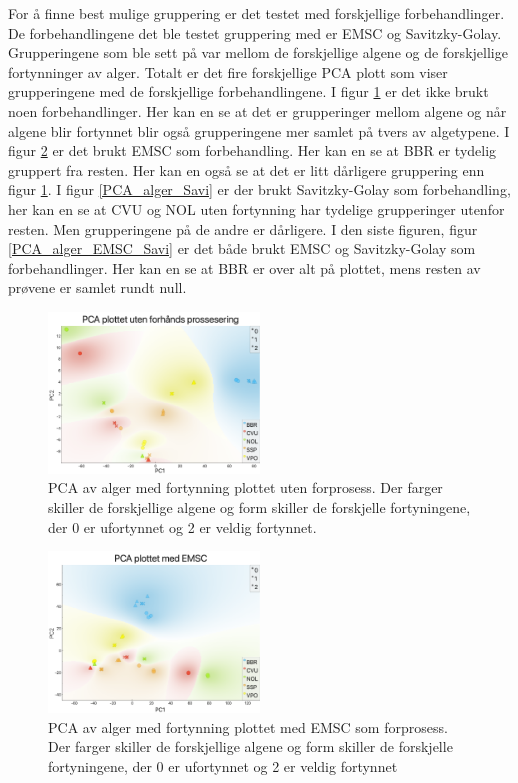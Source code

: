 \documentclass[twocolumn, 11pt]{article} %
\begin{document}
\newpage
For å finne best mulige gruppering er det testet med forskjellige forbehandlinger. De forbehandlingene det ble testet gruppering med er EMSC og Savitzky-Golay. Grupperingene som ble sett på var mellom de forskjellige algene og de forskjellige fortynninger av alger. Totalt er det fire forskjellige PCA plott som viser grupperingene med de forskjellige forbehandlingene. I figur \ref{PCA_alger} er det ikke brukt noen forbehandlinger. Her kan en se at det er grupperinger mellom algene og når algene blir fortynnet blir også grupperingene mer samlet på tvers av algetypene. I figur \ref{PCA_alger_EMSC} er det brukt EMSC som forbehandling. Her kan en se at BBR er tydelig gruppert fra resten. Her kan en også se at det er litt dårligere gruppering enn figur \ref{PCA_alger}.
I figur \ref{PCA_alger_Savi} er der brukt Savitzky-Golay som forbehandling, her kan en se at CVU og NOL uten fortynning har tydelige grupperinger utenfor resten. Men grupperingene på de andre er dårligere. I den siste figuren, figur \ref{PCA_alger_EMSC_Savi} er det både brukt EMSC og Savitzky-Golay som forbehandlinger. Her kan en se at BBR er over alt på plottet, mens resten av prøvene er samlet rundt null.

\begin{figure}[H]
\includegraphics[width=0.5\textwidth]{Lab3/Images/PCA_Uten.png}
\caption{PCA av alger med fortynning plottet uten forprosess. Der farger skiller de forskjellige algene og form skiller de forskjelle fortyningene, der 0 er ufortynnet og 2 er veldig fortynnet.}
\label{PCA_alger}
\end{figure}


\begin{figure}[H]
\includegraphics[width=0.5\textwidth]{Lab3/Images/PCA_EMSC.png}
\caption{PCA av alger med fortynning plottet med EMSC som forprosess. Der farger skiller de forskjellige algene og form skiller de forskjelle fortyningene, der 0 er ufortynnet og 2 er veldig fortynnet}
\label{PCA_alger_EMSC}
\end{figure}
\end{document}
